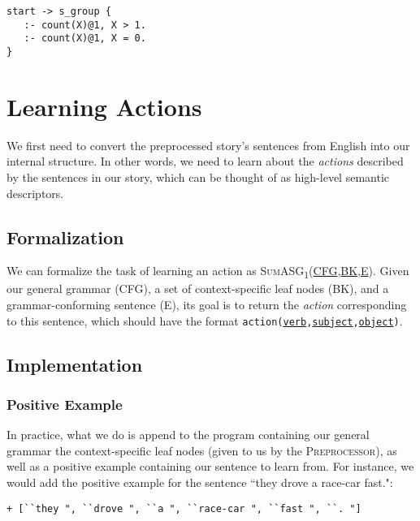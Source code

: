 \begin{displayquote}
\begin{lstlisting}
start -> s_group {
   :- count(X)@1, X > 1.
   :- count(X)@1, X = 0.
}
\end{lstlisting}
\end{displayquote}

\section{Learning Actions}

We first need to convert the preprocessed story's sentences from English into our internal structure. In other words, we need to learn about the \textit{actions} described by the sentences in our story, which can be thought of as high-level semantic descriptors.

\subsection{Formalization}

We can formalize the task of learning an action as \textsc{SumASG\textsubscript{1}(\underline{CFG},\underline{BK},\underline{E})}. Given our general grammar (\textsc{CFG}), a set of context-specific leaf nodes (\textsc{BK}), and a grammar-conforming sentence (\textsc{E}), its goal is to return the \textit{action} corresponding to this sentence, which should have the format \texttt{action(\underline{verb},\underline{subject},\underline{object})}.

\subsection{Implementation}

\subsubsection{Positive Example}

In practice, what we do is append to the program containing our general grammar the context-specific leaf nodes (given to us by the \textsc{Preprocessor}), as well as a positive example containing our sentence to learn from. For instance, we would add the positive example for the sentence ``they drove a race-car fast.":

\begin{displayquote}
\begin{lstlisting}[numbers=none]
+ [``they ", ``drove ", ``a ", ``race-car ", ``fast ", ``. "]
\end{lstlisting}
\end{displayquote}

